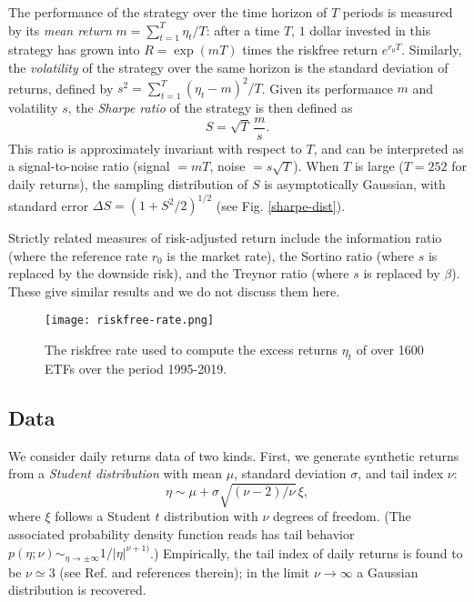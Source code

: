 \documentclass[
reprint,
amsmath,amssymb,
aps,
]{revtex4-2}
\begin{document}
The performance of the strategy over the time horizon of $T$ periods is measured by its \emph{mean return} $m = \sum_{t=1}^T \eta_{t}/T$: after a time $T$, $1$ dollar invested in this strategy has grown into $R = \exp(mT)$ times the riskfree return $e^{r_0T}$. 
Similarly, the \emph{volatility} of the strategy over the same horizon is the standard deviation of returns, defined by $s^2 = \sum_{t=1}^T (\eta_{t} - m)^2/T$.
Given its performance $m$ and volatility $s$, the \emph{Sharpe ratio} of the strategy is then defined as 
\begin{equation}
    S = \sqrt{T}\, \frac{m}{s}.    
\end{equation}
This ratio is approximately invariant with respect to $T$, and can be interpreted as a signal-to-noise ratio (signal $=mT$, noise $=s\sqrt{T}$). When $T$ is large ($T = 252$ for daily returns), the sampling distribution of $S$ is asymptotically Gaussian, with standard error $\Delta S = (1+S^2/2)^{1/2}$ \cite{loStatistics2002} (see Fig. \ref{sharpe-dist}).

Strictly related measures of risk-adjusted return include the information ratio (where the reference rate $r_0$ is the market rate), the Sortino ratio (where $s$ is replaced by the downside risk), and the Treynor ratio (where $s$ is replaced by $\beta$). These give similar results and we do not discuss them here.  


\begin{figure}[t!]
    \texttt{[image: riskfree-rate.png]}
    \caption{The riskfree rate used to compute the excess returns $\eta_t$ of over 1600 ETFs over the period 1995-2019.}
    \label{riskfree-rate}
\end{figure}

\subsection{Data}

We consider daily returns data of two kinds. First, we generate synthetic returns from a \emph{Student distribution} with mean $\mu$, standard deviation $\sigma$, and tail index $\nu$:
\begin{equation}
    \eta \sim \mu + \sigma\sqrt{(\nu - 2)/\nu}\, \xi,
\end{equation}
where $\xi$ follows a Student $t$ distribution with $\nu$ degrees of freedom. (The associated probability density function reads has tail behavior $p(\eta; \nu)\sim_{\eta\to\pm\infty} 1/\vert\eta\vert^{\nu + 1)}$.) 
Empirically, the tail index of daily returns is found to be $\nu\simeq 3$ (see Ref. \cite{bouchaudTheory2003} and references therein); in the limit $\nu\to\infty$ a Gaussian distribution is recovered. 
\end{document}
